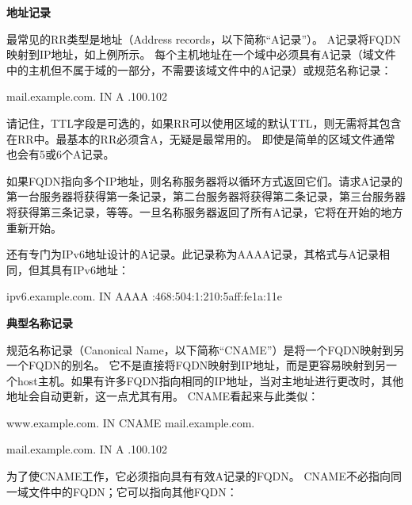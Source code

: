 ﻿\documentclass[english,runningheads,a4paper]{llncs}[2018/03/10]
\begin{document}
\vbox{}

\par\noindent\textbf{地址记录}

\par\noindent 最常见的RR类型是地址（Address records，以下简称“A记录”）。 A记录将FQDN映射到IP地址，如上例所示。 每个主机地址在一个域中必须具有A记录（域文件中的主机但不属于域的一部分，不需要该域文件中的A记录）或规范名称记录：

\par\setlength\parindent{2em}mail.example.com.  \qquad IN \qquad A .100.102

\par\setlength\parindent{2em}请记住，TTL字段是可选的，如果RR可以使用区域的默认TTL，则无需将其包含在RR中。最基本的RR必须含A，无疑是最常用的。 即使是简单的区域文件通常也会有5或6个A记录。

\par\setlength\parindent{2em}如果FQDN指向多个IP地址，则名称服务器将以循环方式返回它们。请求A记录的第一台服务器将获得第一条记录，第二台服务器将获得第二条记录，第三台服务器将获得第三条记录，等等。一旦名称服务器返回了所有A记录，它将在开始的地方重新开始。

\par\setlength\parindent{2em}还有专门为IPv6地址设计的A记录。此记录称为AAAA记录，其格式与A记录相同，但其具有IPv6地址：

\par\setlength\parindent{2em}ipv6.example.com.  \quad IN \quad AAAA :468:504:1:210:5aff:fe1a:11e

\vbox{}

\par\noindent\textbf{典型名称记录}

\par\noindent 规范名称记录（Canonical Name，以下简称“CNAME”）是将一个FQDN映射到另一个FQDN的别名。 它不是直接将FQDN映射到IP地址，而是更容易映射到另一个host主机。如果有许多FQDN指向相同的IP地址，当对主地址进行更改时，其他地址会自动更新，这一点尤其有用。 CNAME看起来与此类似：

\par\setlength\parindent{2em}www.example.com.  \qquad IN \qquad CNAME \qquad mail.example.com.

\par\setlength\parindent{2em}mail.example.com.  \qquad IN \qquad A .100.102

\par\setlength\parindent{2em}为了使CNAME工作，它必须指向具有有效A记录的FQDN。 CNAME不必指向同一域文件中的FQDN；它可以指向其他FQDN：
\end{document}
